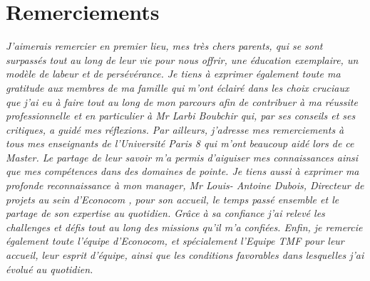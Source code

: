 
\chapter*{Remerciements}
 
\textit{J’aimerais remercier en premier lieu, mes très chers parents, qui se sont surpassés tout au
long de leur vie pour nous offrir, une éducation exemplaire, un modèle de
labeur et de persévérance.
\newline
\newline
Je tiens à exprimer également toute ma gratitude aux membres de ma famille qui m'ont
éclairé dans les choix cruciaux que j’ai eu à faire tout au long de mon parcours afin de
contribuer à ma réussite professionnelle et en particulier à Mr Larbi Boubchir qui, par ses
conseils et ses critiques, a guidé mes réflexions.
\newline
\newline
Par ailleurs, j'adresse mes remerciements à tous mes enseignants de l'Université Paris 8
qui m’ont beaucoup aidé lors de ce Master. Le partage de leur savoir m’a permis d’aiguiser
mes connaissances ainsi que mes compétences dans des domaines de pointe.
\newline
\newline
Je tiens aussi à exprimer ma profonde reconnaissance à mon manager, Mr Louis-
Antoine Dubois, Directeur de projets au sein d’Econocom , pour son accueil, le temps passé
ensemble et le partage de son expertise au quotidien. Grâce à sa confiance j'ai relevé les
challenges et défis tout au long des missions qu’il m’a confiées.
\newline
\newline
Enfin, je remercie également toute l'équipe d’Econocom, et spécialement l’Equipe TMF pour
leur accueil, leur esprit d'équipe, ainsi que les conditions favorables dans lesquelles j’ai évolué
au quotidien.}




